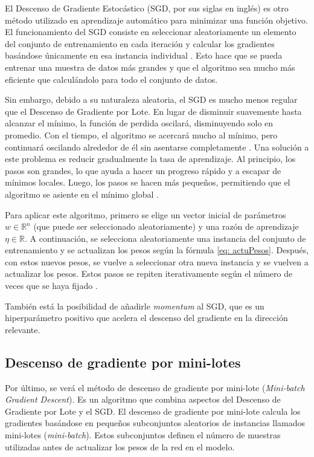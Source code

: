 El Descenso de Gradiente Estocástico (SGD, por sus siglas en inglés) es otro método utilizado en aprendizaje automático para minimizar una función objetivo. El funcionamiento del SGD consiste en seleccionar aleatoriamente un elemento del conjunto de entrenamiento en cada iteración y calcular los gradientes basándose únicamente en esa instancia individual \citep{pajares2021aprendizaje}. Esto hace que se pueda entrenar una muestra de datos más grandes y que el algoritmo sea mucho más eficiente que calculándolo para todo el conjunto de datos. 

Sin embargo, debido a su naturaleza aleatoria, el SGD es mucho menos regular que el Descenso de Gradiente por Lote. En lugar de disminuir suavemente hasta alcanzar el mínimo, la función de perdida oscilará, disminuyendo solo en promedio. Con el tiempo, el algoritmo se acercará mucho al mínimo, pero continuará oscilando alrededor de él sin asentarse completamente \citep{geron2022hands}. Una solución a este problema es reducir gradualmente la tasa de aprendizaje. Al principio, los pasos son grandes, lo que ayuda a hacer un progreso rápido y a escapar de mínimos locales. Luego, los pasos se hacen más pequeños, permitiendo que el algoritmo se asiente en el mínimo global \citep{geron2022hands}.


Para aplicar este algoritmo, primero se elige un vector inicial de parámetros \( w \in \mathbb{R}^n\) (que puede ser seleccionado aleatoriamente) y una razón de aprendizaje \( \eta \in \mathbb{R} \). A continuación, se selecciona aleatoriamente una instancia del conjunto de entrenamiento y se actualizan los pesos según la fórmula \ref{eq: actuPesos}. Después, con estos nuevos pesos, se vuelve a seleccionar otra nueva instancia y se vuelven a actualizar los pesos. Estos pasos se repiten iterativamente según el número de veces que se haya fijado \citep{pajares2021aprendizaje}. 

También está la posibilidad de añadirle \textit{momentum} al SGD, que es un hiperparámetro positivo que acelera el descenso del gradiente en la dirección relevante. 


\subsection{Descenso de gradiente por mini-lotes}

Por último, se verá el método de descenso de gradiente por mini-lote (\textit{Mini-batch Gradient Descent}). Es un algoritmo que combina aspectos del Descenso de Gradiente por Lote y el SGD. El descenso de gradiente por mini-lote calcula los gradientes basándose en pequeños subconjuntos aleatorios de instancias llamados mini-lotes (\textit{mini-batch}). Estos subconjuntos definen el número de muestras utilizadas antes de actualizar los pesos de la red en el modelo. 

